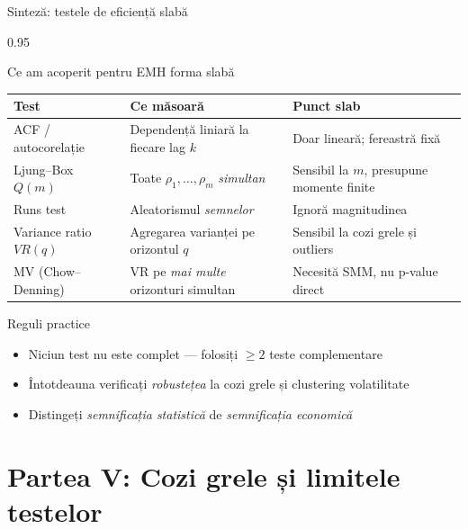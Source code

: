 \documentclass[9pt, aspectratio=169, t]{beamer}
\begin{document}
\begin{frame}[shrink=15]{Sinteză: testele de eficiență slabă}
\begin{cminipage}{0.95\textwidth}
\begin{block}{Ce am acoperit pentru EMH forma slabă}
\renewcommand{\arraystretch}{1.25}
\begin{center}
\footnotesize
\begin{tabular}{lll}
\toprule
\textbf{Test} & \textbf{Ce măsoară} & \textbf{Punct slab} \\
\midrule
ACF / autocorelație & Dependență liniară la fiecare lag $k$ & Doar lineară; fereastră fixă \\
Ljung--Box $Q(m)$ & Toate $\rho_1, \ldots, \rho_m$ \emph{simultan} & Sensibil la $m$, presupune momente finite \\
Runs test & Aleatorismul \emph{semnelor} & Ignoră magnitudinea \\
Variance ratio $VR(q)$ & Agregarea varianței pe orizontul $q$ & Sensibil la cozi grele și outliers \\
MV (Chow--Denning) & VR pe \emph{mai multe} orizonturi simultan & Necesită SMM, nu p-value direct \\
\bottomrule
\end{tabular}
\end{center}
\end{block}

\vspace{0.15cm}
\begin{alertblock}{Reguli practice}
\begin{itemize}\setlength{\itemsep}{0pt}
    \item Niciun test nu este complet --- folosiți $\geq 2$ teste complementare
    \item Întotdeauna verificați \emph{robustețea} la cozi grele și clustering volatilitate
    \item Distingeți \emph{semnificația statistică} de \emph{semnificația economică}
\end{itemize}
\end{alertblock}
\end{cminipage}
\end{frame}

\section{Partea V: Cozi grele și limitele testelor}
\end{document}
